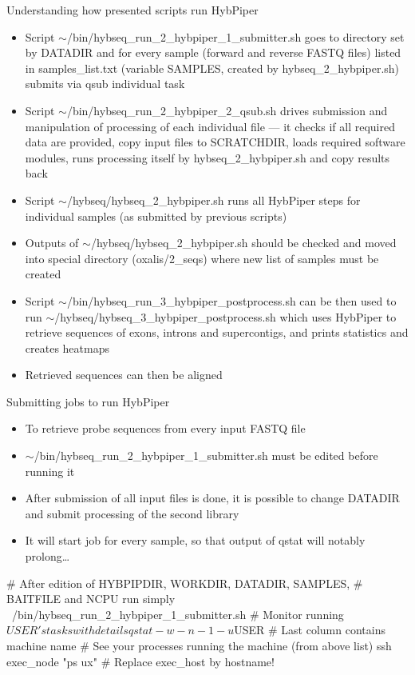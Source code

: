 \documentclass[compress, ucs, xelatex, 11pt, xcolor=x11names, aspectratio=169,
	hyperref={
		bookmarks=true,
		unicode=true,
		colorlinks=true,
		pdftitle={HybSeq course},
		plainpages=false,
		pdfauthor={Vojtech Zeisek},
		pdfsubject={Practical processing of HybSeq target enrichment sequencing data on computing grids like MetaCentrum},
		pdfcreator={XeLaTeX},
		pdfkeywords={BASH, command line, GNU, HybSeq, Linux, MetaCentrum, sequencing shell, target enrichment},
		linkcolor=Cyan2, %
		anchorcolor=Firebrick2, %
		citecolor=Firebrick2, %
		filecolor=Firebrick2, %
		menucolor=Firebrick2, %
		urlcolor=Chartreuse2, %
		pdftex},
	url={hyphens, lowtilde} %
	]{beamer}
\renewcommand{\texttt}[1]{\colorbox{Snow4}{{\ttfamily #1}}}
\renewcommand{\alert}[1]{\textcolor{OrangeRed2}{#1}}
\begin{document}
\begin{frame}[allowframebreaks]{Understanding how presented scripts run HybPiper}
	\begin{itemize}
		\item Script \texttt{$\sim$/bin/hybseq\_run\_2\_hybpiper\_1\_submitter.sh} goes to directory set by \texttt{DATADIR} and for every sample (forward and reverse FASTQ files) listed in \texttt{samples\_list.txt} (variable \texttt{SAMPLES}, created by \texttt{hybseq\_2\_hybpiper.sh}) submits via \texttt{qsub} individual task
		\item Script \texttt{$\sim$/bin/hybseq\_run\_2\_hybpiper\_2\_qsub.sh} drives submission and manipulation of processing of each individual file --- it checks if all required data are provided, copy input files to \texttt{SCRATCHDIR}, loads required software modules, runs processing itself by \texttt{hybseq\_2\_hybpiper.sh} and copy results back
		\item Script \texttt{$\sim$/hybseq/hybseq\_2\_hybpiper.sh} runs all HybPiper steps for individual samples (as submitted by previous scripts)
		\item Outputs of \texttt{$\sim$/hybseq/hybseq\_2\_hybpiper.sh} should be checked and moved into special directory (\texttt{oxalis/2\_seqs}) where new list of samples must be created
		\item Script \texttt{$\sim$/bin/hybseq\_run\_3\_hybpiper\_postprocess.sh} can be then used to run \texttt{$\sim$/hybseq/hybseq\_3\_hybpiper\_postprocess.sh} which uses HybPiper to retrieve sequences of exons, introns and supercontigs, and prints statistics and creates heatmaps
		\item Retrieved sequences can then be aligned
	\end{itemize}
\end{frame}

\begin{frame}[fragile]{Submitting jobs to run HybPiper}
	\begin{itemize}
		\item To retrieve probe sequences from every input FASTQ file
		\item \alert{\texttt{$\sim$/bin/hybseq\_run\_2\_hybpiper\_1\_submitter.sh} must be edited before running it}
		\item After submission of all input files is done, it is possible to change \texttt{DATADIR} and submit processing of the second library
		\item It will start job for every sample, so that output of \texttt{qstat} will notably prolong\ldots
	\end{itemize}
	\begin{bashcode}
    # After edition of HYBPIPDIR, WORKDIR, DATADIR, SAMPLES,
    # BAITFILE and NCPU run simply
    ~/bin/hybseq_run_2_hybpiper_1_submitter.sh
    # Monitor running $USER's tasks with details
    qstat -w -n -1 -u $USER # Last column contains machine name
    # See your processes running the machine (from above list)
    ssh exec_node "ps ux" # Replace exec_host by hostname!
	\end{bashcode}
\end{frame}
\end{document}
